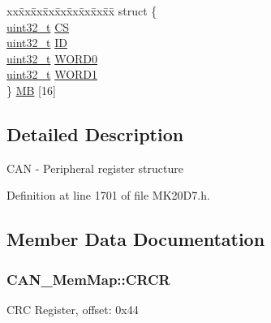 \begin{DoxyCompactItemize}
\begin{tabbing}
\end{tabbing}\item 
\begin{tabbing}
xx\=xx\=xx\=xx\=xx\=xx\=xx\=xx\=xx\=\kill
struct \{\\
\>\hyperlink{_p_e___types_8h_a33594304e786b158f3fb30289278f5af}{uint32\_t} \hyperlink{struct_c_a_n___mem_map_ac511ae72304784d21dd721b3da9b0e34}{CS}\\
\>\hyperlink{_p_e___types_8h_a33594304e786b158f3fb30289278f5af}{uint32\_t} \hyperlink{struct_c_a_n___mem_map_a974cc9d286388361bc15ab95bc264671}{ID}\\
\>\hyperlink{_p_e___types_8h_a33594304e786b158f3fb30289278f5af}{uint32\_t} \hyperlink{struct_c_a_n___mem_map_ac2b68cfbc9aeab141d20ae8bd73cd169}{WORD0}\\
\>\hyperlink{_p_e___types_8h_a33594304e786b158f3fb30289278f5af}{uint32\_t} \hyperlink{struct_c_a_n___mem_map_ae9343e0c532c0f3784d9960ffb8aa229}{WORD1}\\
\} \hyperlink{struct_c_a_n___mem_map_ae0b2fe9e8228155099ffb970b67db8a9}{MB} \mbox{[}16\mbox{]}\\

\end{tabbing}\end{DoxyCompactItemize}


\subsection{Detailed Description}
C\+AN -\/ Peripheral register structure 

Definition at line 1701 of file M\+K20\+D7.\+h.



\subsection{Member Data Documentation}
\subsubsection[{\texorpdfstring{C\+R\+CR}{CRCR}}]{ C\+A\+N\+\_\+\+Mem\+Map\+::\+C\+R\+CR}\hypertarget{struct_c_a_n___mem_map_ad1266b0f09eab6a6efd5778d0704da82}{}\label{struct_c_a_n___mem_map_ad1266b0f09eab6a6efd5778d0704da82}
C\+RC Register, offset\+: 0x44 

